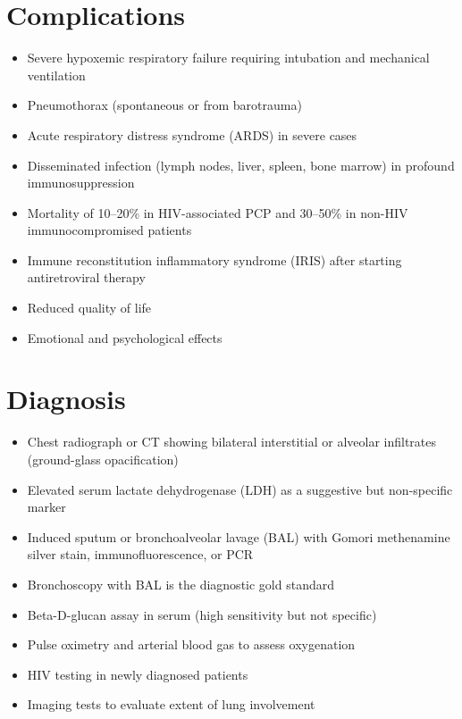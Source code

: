 \section{Complications}

\begin{itemize}[noitemsep]
  \item Severe hypoxemic respiratory failure requiring intubation and mechanical ventilation
  \item Pneumothorax (spontaneous or from barotrauma)
  \item Acute respiratory distress syndrome (ARDS) in severe cases
  \item Disseminated infection (lymph nodes, liver, spleen, bone marrow) in profound immunosuppression
  \item Mortality of 10--20\% in HIV-associated PCP and 30--50\% in non-HIV immunocompromised patients
  \item Immune reconstitution inflammatory syndrome (IRIS) after starting antiretroviral therapy
  \item Reduced quality of life
  \item Emotional and psychological effects
\end{itemize}

\section{Diagnosis}

\begin{itemize}[noitemsep]
  \item Chest radiograph or CT showing bilateral interstitial or alveolar infiltrates (ground-glass opacification)
  \item Elevated serum lactate dehydrogenase (LDH) as a suggestive but non-specific marker
  \item Induced sputum or bronchoalveolar lavage (BAL) with Gomori methenamine silver stain, immunofluorescence, or PCR
  \item Bronchoscopy with BAL is the diagnostic gold standard
  \item Beta-D-glucan assay in serum (high sensitivity but not specific)
  \item Pulse oximetry and arterial blood gas to assess oxygenation
  \item HIV testing in newly diagnosed patients
  \item Imaging tests to evaluate extent of lung involvement
\end{itemize}

